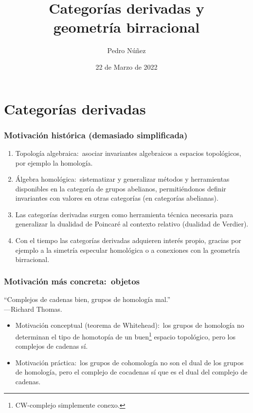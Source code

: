 \documentclass[12pt]{beamer}
\title[Categorías derivadas y geometría birracional]{Categorías derivadas y \\ geometría birracional}
\author{Pedro N\'{u}\~{n}ez}
\institute{Red de Doctorandos en Matemáticas UCM}
\date{22 de Marzo de 2022}
\begin{document}
\frame{\titlepage}

\section{Categorías derivadas}

\begin{frame}
  \frametitle{Motivación histórica (demasiado simplificada)}
  \begin{enumerate}
    \item Topología algebraica:~asociar invariantes algebraicos a espacios topológicos, por ejemplo la homología.
      \pause
    \item Álgebra homológica:~sistematizar y generalizar métodos y herramientas disponibles en la categoría de grupos abelianos, permitiéndonos definir invariantes con valores en otras categorías (en categorías abelianas).
      \pause
    \item Las categorías derivadas surgen como herramienta técnica necesaria para generalizar la dualidad de Poincaré al contexto relativo (dualidad de Verdier).
      \pause
    \item Con el tiempo las categorías derivadas adquieren interés propio, gracias por ejemplo a la simetría especular homológica o a conexiones con la geometría birracional.
  \end{enumerate}
\end{frame}

\begin{frame}
  \frametitle{Motivación más concreta:~objetos}
  \begin{center}
    ``Complejos de cadenas bien, grupos de homología mal.'' \\
    \hfill ---Richard Thomas.
  \end{center}
  \pause
  \begin{itemize}
    \item Motivación conceptual (teorema de Whitehead):~los grupos de homología no determinan el tipo de homotopía de un buen\footnote{CW-complejo simplemente conexo.} espacio topológico, pero los complejos de cadenas sí.
      \pause
    \item Motivación práctica:~los grupos de cohomología no son el dual de los grupos de homología, pero el complejo de cocadenas sí que es el dual del complejo de cadenas.
  \end{itemize}
\end{frame}
\end{document}
